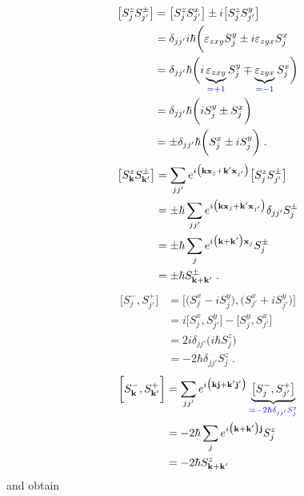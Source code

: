%
\begin{align*}
\big[S_{j}^{z} S^{\pm}_{j'}\big] &=\big[S_{j}^{z} S^{x}_{j'}\big] \pm i
\big[S_{j}^{z} S^{y}_{j'}\big]\\
&=\delta_{jj'}
i \hbar \bigg( \varepsilon_{z x y} S^{y}_{j}
\pm i \varepsilon_{z y x} S^{x}_{j}\\
&=\delta_{jj'}
 \hbar \bigg(i \underbrace{
\varepsilon_{z x y}
}_{\color{blue} = +1} S^{y}_{j}
\mp  \underbrace{
\varepsilon_{z y x}
}_{\color{blue} = -1} S^{x}_{j}
\bigg)\\
&= \delta_{jj'} \hbar \bigg(i S^{y}_{j} \pm  S^{x}_{j}\bigg)\\
&=\pm \delta_{jj'} \hbar \bigg(S^{x}_{j} \pm i S^{y}_{j}   \bigg)\;.
\end{align*}
%
%
\begin{align*}
\big[S_{\mathbf k}^{z} S^{\pm}_{\mathbf k'}\big] 
&=
\sum_{jj'}e^{i\big(\mathbf k \mathbf x_{j} + \mathbf k' \mathbf x_{j'}\big)}
\big[S_{j}^{z} S^{\pm}_{ j'}\big] 
\\
&=\pm \hbar 
\sum_{jj'}e^{i\big(\mathbf k \mathbf x_{j} + \mathbf k' \mathbf x_{j'}\big)}
\delta_{jj'} S^{\pm}_{j}\\
&=\pm  \hbar 
\sum_{j}e^{i\big(\mathbf k + \mathbf k' \big)\mathbf x_{j}} S^{\pm}_{j}\\
&=\pm  \hbar S^{\pm}_{\mathbf k+\mathbf k'}\;.
\end{align*}
%
%
\begin{align*}
\big[S^{-}_{j},S^{+}_{j'}\big] 
&=\big[\big(S^{x}_{j}- iS ^{y}_{j}\big),\big(S^{x}_{j'}+ i S^{y}_{j'}\big)\big] \\
&=i \big[S^{x}_{j},S^{y}_{j'}\big]
 -  \big[S^{y}_{j},S^{x}_{j'}\big]\\
&= 2 i  \delta_{jj'} \big(i \hbar S_{j}^{z}\big)\\
&= - 2  \hbar \delta_{jj'}  S_{j}^{z}\;.
\end{align*}
%
%
\begin{align*}
\bigg[S^{-}_{\mathbf k},S^{+}_{\mathbf k'}\bigg] &= \sum_{jj'}
e^{i\big(\mathbf k \vb{j}+\mathbf k' \vb{j'}\big)}
\underbrace{
\big[S^{-}_{j},S^{+}_{j'}\big]
}_{\color{blue} = - 2\hbar \delta_{jj'}S^{z}_{j}}\\
&= -2 \hbar \sum_{j}
e^{i\big(\mathbf k+\mathbf k' \big)\vb{j}}
S^{z}_{j}\\
&= -2 \hbar S^{z}_{\mathbf k +\mathbf k'}\
\end{align*}
%
and obtain
%
